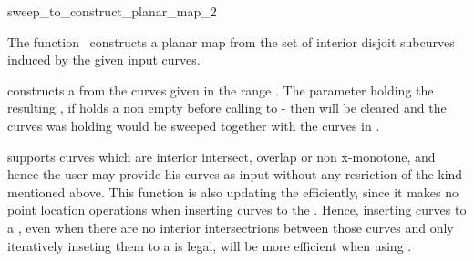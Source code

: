 

\begin{ccRefFunction}[CGAL::]{sweep_to_construct_planar_map_2}  %


\ccDefinition
  
The function \ccRefName\ constructs a planar map from the set of 
interior disjoit subcurves induced by the given input curves.



\def\ccLongParamLayout{\ccTrue} 


constructs a  from the curves given in the range
\ccStyle{[curves_begin, curves_end)}. The parameter 
holding the resulting , if  holds a
non empty  before calling to
 - then  will be
cleared and the curves  was holding would be sweeped
together with the curves in \ccStyle{[curves_begin, curves_end)}.

 supports curves which are
interior intersect, overlap or non x-monotone, and hence the user may
provide his curves as input without any resriction of the kind
mentioned above. This function is also updating the 
efficiently, since it makes no point location operations when
inserting curves to the . Hence, inserting curves to a
, even when there are no interior intersectrions
between those curves and only iteratively inseting them to a
 is legal, will be more efficient when using
.


\end{ccRefFunction}
